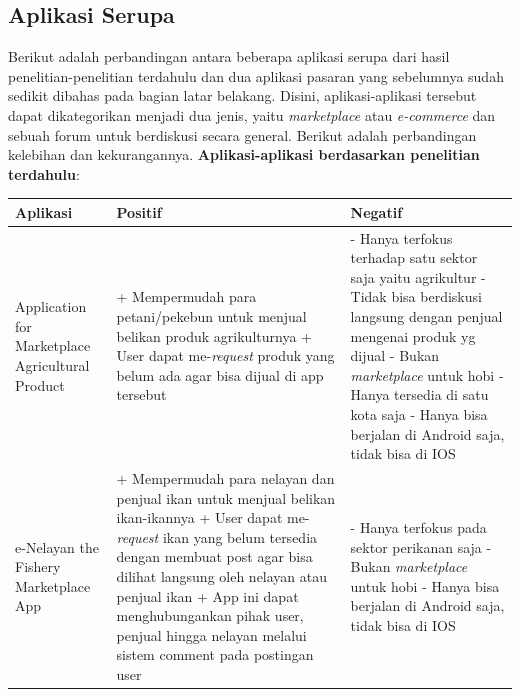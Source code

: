 \documentclass[a4paper]{article}
\newcommand{\subbab}[1]{%
    \subsection{#1}%
    \setcounter{figure}{0}
    \setcounter{table}{0}
}
\begin{document}
\subbab{Aplikasi Serupa}
Berikut adalah perbandingan antara beberapa aplikasi serupa dari hasil penelitian-penelitian terdahulu dan dua aplikasi pasaran yang sebelumnya sudah sedikit dibahas pada bagian latar belakang. Disini, aplikasi-aplikasi tersebut dapat dikategorikan menjadi dua jenis, yaitu \textit{marketplace} atau \textit{e-commerce} dan sebuah forum untuk berdiskusi secara general. Berikut adalah perbandingan kelebihan dan kekurangannya.
\textbf{Aplikasi-aplikasi berdasarkan penelitian terdahulu}:
\begin{longtable}{|p{3cm}|p{5cm}|p{5cm}|}
    \hline
    Aplikasi & Positif                                                                                                                 & Negatif \\
    \hline
    Application for Marketplace Agricultural Product
             & + Mempermudah para petani/pekebun untuk menjual belikan produk agrikulturnya \newline
    + User dapat me-\textit{request} produk yang belum ada agar bisa dijual di app tersebut \newline
             & - Hanya terfokus terhadap satu sektor saja yaitu agrikultur \newline
    - Tidak bisa berdiskusi langsung dengan penjual mengenai produk yg dijual \newline
    - Bukan \textit{marketplace} untuk hobi \newline
    - Hanya tersedia di satu kota saja \newline
    - Hanya bisa berjalan di Android saja, tidak bisa di IOS                                                                                     \\
    \hline
    e-Nelayan the Fishery Marketplace App
             & + Mempermudah para nelayan dan penjual ikan untuk menjual belikan ikan-ikannya \newline
    + User dapat me-\textit{request} ikan yang belum tersedia dengan membuat post agar bisa dilihat langsung oleh nelayan atau penjual ikan \newline
    + App ini dapat menghubungankan pihak user, penjual hingga nelayan melalui sistem comment pada postingan user \newline
             & - Hanya terfokus pada sektor perikanan saja \newline
    - Bukan \textit{marketplace} untuk hobi \newline
    - Hanya bisa berjalan di Android saja, tidak bisa di IOS                                                                                     \\

\end{longtable}
\end{document}
